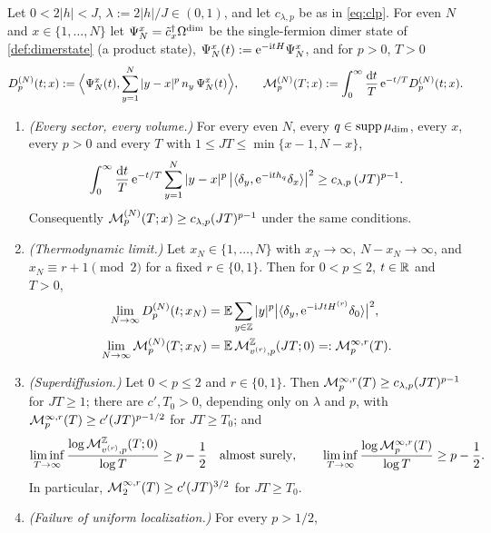 \begin{theorem}\label{thm:dimer}
Let $0<2|h|<J$, $\lambda:=2|h|/J\in(0,1)$, and let $c_{\lambda,p}$ be as in \eqref{eq:clp}.  For even $N$
and $x\in\{1,\dots,N\}$ let $\Psi^x_N=\tilde c_x^\dagger\Omega^{\mathrm{dim}}$ be the single-fermion dimer state of
\cref{def:dimerstate} (a product state), $\Psi^x_N(t):=\mathrm{e}^{-\mathrm{i} tH}\Psi^x_N$, and for $p>0$, $T>0$
\begin{equation}\label{eq:LGTmoments}
  D^{(N)}_p(t;x):=\Bigl\langle\Psi^x_N(t),\sum_{y=1}^N|y-x|^p\,n_y\,\Psi^x_N(t)\Bigr\rangle,\qquad
  \mathcal{M}^{(N)}_p(T;x):=\int_0^\infty\frac{\mathrm{d} t}{T}\,\mathrm{e}^{-t/T}D^{(N)}_p(t;x).
\end{equation}
\begin{enumerate}[label=(\alph*)]
\item \emph{(Every sector, every volume.)}  For every even $N$, every $q\in\operatorname{supp}\mu_{\mathrm{dim}}$, every $x$, every
$p>0$ and every $T$ with $1\le JT\le\min\{x-1,N-x\}$,
\begin{equation}\label{eq:dimerLGTa}
  \int_0^\infty\frac{\mathrm{d} t}{T}\,\mathrm{e}^{-t/T}\sum_{y=1}^N|y-x|^p\,\bigl|\langle\delta_y,\mathrm{e}^{-\mathrm{i} th_{q}}\delta_x\rangle\bigr|^2
  \ge c_{\lambda,p}\,(JT)^{p-1}.
\end{equation}
Consequently $\mathcal{M}^{(N)}_p(T;x)\ge c_{\lambda,p}(JT)^{p-1}$ under the same conditions.
\item \emph{(Thermodynamic limit.)}  Let $x_N\in\{1,\dots,N\}$ with $x_N\to\infty$, $N-x_N\to\infty$, and
$x_N\equiv r+1\pmod2$ for a fixed $r\in\{0,1\}$.  Then for $0<p\le2$, $t\in\mathbb{R}$ and $T>0$,
\begin{align*}
  \lim_{N\to\infty}D^{(N)}_p(t;x_N)&=\mathbb{E}\sum_{y\in\mathbb{Z}}|y|^p\bigl|\langle\delta_y,\mathrm{e}^{-\mathrm{i} JtH^{(r)}}\delta_0\rangle\bigr|^2,\\
  \lim_{N\to\infty}\mathcal{M}^{(N)}_p(T;x_N)&=\mathbb{E}\,\mathcal{M}^{\mathbb{Z}}_{v^{(r)},p}(JT;0)=:\mathcal{M}^{\infty,r}_p(T).
\end{align*}
\item \emph{(Superdiffusion.)}  Let $0<p\le2$ and $r\in\{0,1\}$.  Then
$\mathcal{M}^{\infty,r}_p(T)\ge c_{\lambda,p}(JT)^{p-1}$ for $JT\ge1$; there are $c',T_0>0$, depending only on $\lambda$ and $p$, with
$\mathcal{M}^{\infty,r}_p(T)\ge c'(JT)^{p-1/2}$ for $JT\ge T_0$; and
\[
  \liminf_{T\to\infty}\frac{\log\mathcal{M}^{\mathbb{Z}}_{v^{(r)},p}(T;0)}{\log T}\ge p-\frac12\quad\text{almost surely},\qquad
  \liminf_{T\to\infty}\frac{\log\mathcal{M}^{\infty,r}_p(T)}{\log T}\ge p-\frac12 .
\]
In particular, $\mathcal{M}^{\infty,r}_2(T)\ge c'(JT)^{3/2}$ for $JT\ge T_0$.
\item \emph{(Failure of uniform localization.)}  For every $p>1/2$,

\end{enumerate}
\end{theorem}
